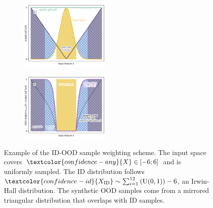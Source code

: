 \begin{multicols}{2}
\begin{figure}[H]
        \vspace{-1em}
        \begin{subfigure}
            \centering
            \includegraphics[width=0.49\textwidth]{ood-detection/figures/weighting/id-ood-weights-2.pdf}
        \end{subfigure}

        \vspace{-1em}
        \begin{subfigure}
            \centering
            \includegraphics[width=0.49\textwidth]{ood-detection/figures/weighting/id-ood-weights-3.pdf}
        \end{subfigure}

        \vspace{-2em}
        \caption[ID-OOD Weighting Example]{Example of the ID-OOD sample weighting scheme. The \textcolor{confidence-any}{input space} covers $\textcolor{confidence-any}{X} \in [-6; 6]$ and is uniformly sampled. The \textcolor{confidence-id}{ID distribution} follows $\textcolor{confidence-id}{X_{\text{ID}}} \sim \sum_{i=1}^{12}\left(\text{U}(0, 1)\right) - 6$, an Irwin-Hall distribution. The \textcolor{confidence-ood}{synthetic OOD samples} come from a mirrored triangular distribution that overlaps with ID samples.}
        \label{fig:id-ood-weights}
    \end{figure}
\end{multicols}


